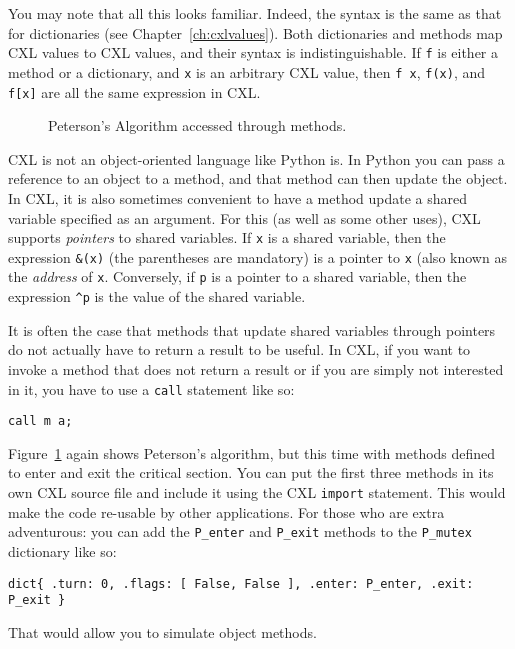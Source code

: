 \documentclass{report}
\newenvironment{code}{
\tcolorbox
}{
\endtcolorbox
}
\begin{document}
You may note that all this looks familiar.  Indeed, the syntax
is the same as that for dictionaries (see Chapter~\ref{ch:cxlvalues}).
Both dictionaries and methods map CXL values to CXL values,
and their syntax is indistinguishable.
If \texttt{f} is either a method or a
dictionary, and \texttt{x} is an arbitrary CXL value, then
\texttt{f x}, \texttt{f(x)}, and \texttt{f[x]} are all
the same expression in CXL.

\begin{figure}
\begin{code}

\end{code}
\caption{Peterson's Algorithm accessed through methods.}
\label{fig:petersonmethods}
\end{figure}

CXL is not an object-oriented language like Python is.  In Python
you can pass a reference to an object to a method, and that method
can then update the object.  In CXL, it is also sometimes convenient
to have a method update a shared variable specified as an argument.
For this (as well as some other uses), CXL supports \emph{pointers}
to shared variables.
If \texttt{x} is a shared variable, then the expression \texttt{\&(x)}
(the parentheses are mandatory) is a pointer to \texttt{x}
(also known as the \emph{address} of \texttt{x}.
Conversely, if \texttt{p} is a pointer to a shared variable, then the
expression \texttt{\^{}p} is the value of the shared variable.

It is often the case that methods that update shared variables through
pointers do not actually have to return a result to be useful.
In CXL, if you want to invoke a method that does not return a result
or if you are simply not interested in it,
you have to use a \texttt{call} statement like so:
\begin{code}
\begin{verbatim}
call m a;
\end{verbatim}
\end{code}

Figure~\ref{fig:petersonmethods} again shows Peterson's algorithm,
but this time with methods defined to enter and exit the critical
section.
You can put the first three methods in its own CXL source file
and include it using the CXL \texttt{import} statement.  This would
make the code re-usable by other applications.  For those who are
extra adventurous: you can add the \texttt{P\_enter} and
\texttt{P\_exit} methods to the \texttt{P\_mutex} dictionary
like so:
\begin{code}
\begin{verbatim}
dict{ .turn: 0, .flags: [ False, False ], .enter: P_enter, .exit: P_exit }
\end{verbatim}
\end{code}
That would allow you to simulate object methods.
\end{document}
